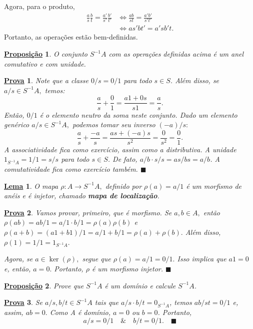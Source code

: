 \documentclass{article}
\newtheorem*{lemma*}{\underline{Lema}}
\newtheorem*{prop*}{\underline{Proposi\c c\~ao}}
\newtheorem*{proof*}{\underline{Prova}}
\renewcommand\qedsymbol{$\blacksquare$}
\begin{document}
Agora, para o produto, 
\begin{align*}
  \frac{a}{s}\frac{b}{t} = \frac{a'}{s'}\frac{b'}{t'} &\Longleftrightarrow \frac{ab}{st}=\frac{a'b'}{s't'}\\
                                                      &\Longleftrightarrow as'bt' = a'sb't. 
\end{align*}
Portanto, as operações estão bem-definidas.
\begin{prop*}
  O conjunto \(S^{-1}A\) com as operações definidas acima é um anel comutativo e com unidade.
\end{prop*}
\begin{proof*}
  Note que a classe \(0/s = 0/1\) para todo \(s\in S\). Além disso, se \(a/s\in S^{-1}A,\) temos:
  \[
    \frac{a}{s}+\frac{0}{1} = \frac{a1 + 0s}{s1} = \frac{a}{s}.
  \]  
  Então, \(0/1\) é o elemento neutro da soma neste conjunto. Dado um elemento genérico \(a/s\in S^{-1}A,\) podemos tomar seu inverso \((-a)/s:\)
  \[
    \frac{a}{s}+\frac{-a}{s} = \frac{as + (-a)s}{s^{2}} = \frac{0}{s^{2}} = \frac{0}{1}.
  \]
  A associatividade fica como exercício, assim como a distributiva. A unidade \(1_{S^{-1}A} = 1/1 = s/s \) para todo \(s\in S\). De fato,
  \(a/b \cdot s/s = as/bs = a/b\). A comutatividade fica como exercício também. \qedsymbol
\end{proof*}
\begin{lemma*}
  O mapa \(\rho :A\rightarrow S^{-1}A,\) definido por \(\rho (a) = a/1\) é um morfismo de anéis e é injetor, chamado \textbf{mapa de localização}.
\end{lemma*}
\begin{proof*}
  Vamos provar, primeiro, que é morfismo. Se \(a, b\in A,\) então \(\rho (ab) = ab/1 = a/1 \cdot b/1 = \rho (a)\rho (b)\) e \(\rho (a+b) = (a1+b1)/1 = a/1 + b/1 = \rho (a) + \rho (b).\)
  Além disso, \(\rho (1) = 1/1 = 1_{S^{-1}A}.\)

  Agora, se \(a\in\ker{(\rho )},\) segue que \(\rho (a) = a/1 = 0/1.\) Isso implica que \(a1 = 0\) e, então, \(a = 0.\) Portanto,
  \(\rho \) é um morfismo injetor. \qedsymbol
\end{proof*}
\begin{prop*}
  Prove que \(S^{-1}A\) é um domínio e calcule \(S^{-1}A\).  
\end{prop*}
\begin{proof*}
  Se \(a/s, b/t\in S^{-1}A\) tais que \(a/s \cdot b/t = 0_{S^{-1}A}\), temos \(ab/st = 0/1\) e, assim,
  \(ab = 0.\) Como A é domínio, \(a = 0\) ou \(b = 0\). Portanto,
  \[
    a/s = 0/1\quad\&\quad b/t = 0/1.\quad \text{\qedsymbol}
  \]
\end{proof*}
\newpage
\end{document}
